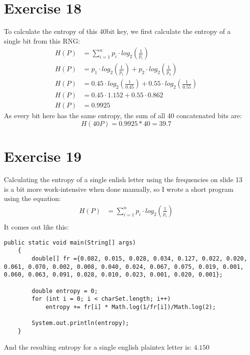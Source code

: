\section*{Exercise 18}
To calculate the entropy of this 40bit key, we first calculate the entropy of a
single bit from this RNG:
\begin{equation*}
\begin{split}
H(P) &= \displaystyle\sum_{i=1}^{n} p_i \cdot log_2\left(\frac{1}{p_i}\right)\\
H(P) &= p_1 \cdot log_2\left(\frac{1}{p_1}\right) + p_2 \cdot
		log_2\left(\frac{1}{p_2}\right)\\
H(P) &= 0.45 \cdot log_2 \left(\frac{1}{0.45}\right) + 0.55 \cdot
		log_2\left(\frac{1}{0.55}\right)\\
H(P) &= 0.45 \cdot 1.152 + 0.55 \cdot 0.862\\
H(P) &= 0.9925
\end{split}
\end{equation*}
As every bit here has the same entropy, the sum of all 40 concatenated bits are:
\begin{equation*}
H(40P) = 0.9925 * 40 =  39.7
\end{equation*}
\section*{Exercise 19}
Calculating the entropy of a single enlish letter using the frequencies on
slide 13 is a bit more work-intensive when done manually, so I wrote a short
program using the equation:
\begin{equation*}
\begin{split}
H(P) &= \displaystyle\sum_{i=1}^{n} p_i \cdot log_2\left(\frac{1}{p_i}\right)\\
\end{split}
\end{equation*}
It comes out like this:
\begin{lstlisting}
public static void main(String[] args)
	{
		double[] fr ={0.082, 0.015, 0.028, 0.034, 0.127, 0.022, 0.020, 0.061, 0.070, 0.002, 0.008, 0.040, 0.024, 0.067, 0.075, 0.019, 0.001, 0.060, 0.063, 0.091, 0.028, 0.010, 0.023, 0.001, 0.020, 0.001};
				
		double entropy = 0;
		for (int i = 0; i < charSet.length; i++)
			entropy += fr[i] * Math.log(1/fr[i])/Math.log(2);
		
		System.out.println(entropy);
	}
\end{lstlisting}
And the resulting entropy for a single english plaintex letter is:
$4.150$
